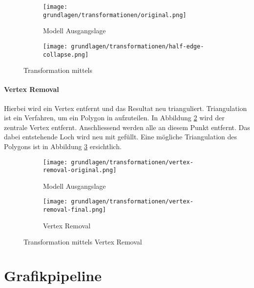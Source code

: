 \begin{figure}[H]
  \centering
  \begin{subfigure}{.5\textwidth}
    \centering
    \texttt{[image: grundlagen/transformationen/original.png]}
    \caption{Modell Ausgangslage}
  \end{subfigure}%
  \begin{subfigure}{.5\textwidth}
    \centering
    \texttt{[image: grundlagen/transformationen/half-edge-collapse.png]}
    \caption{}
  \end{subfigure}
  \caption{Transformation mittels }
  \label{fig:transformationHalfedgeCollapse}
\end{figure}

\paragraph{Vertex Removal}
Hierbei wird ein Vertex entfernt und das Resultat neu trianguliert. Triangulation ist ein Verfahren, um ein Polygon in  aufzuteilen.
In Abbildung \ref{fig:transformationVertexRemovalOriginal} wird der zentrale Vertex entfernt. Anschliessend werden alle  an diesem Punkt entfernt. Das dabei entstehende Loch wird neu mit  gefüllt. Eine mögliche Triangulation des Polygons ist in Abbildung \ref{fig:transformationVertexRemovalFinal} ersichtlich.

\begin{figure}[H]
  \centering
  \begin{subfigure}{.5\textwidth}
    \centering
    \texttt{[image: grundlagen/transformationen/vertex-removal-original.png]}
    \caption{Modell Ausgangslage}
    \label{fig:transformationVertexRemovalOriginal}
  \end{subfigure}%
  \begin{subfigure}{.5\textwidth}
    \centering
    \texttt{[image: grundlagen/transformationen/vertex-removal-final.png]}
    \caption{Vertex Removal}
    \label{fig:transformationVertexRemovalFinal}
  \end{subfigure}
  \caption{Transformation mittels Vertex Removal}
  \label{fig:transformationVertexRemoval}
\end{figure}

\section{Grafikpipeline}

